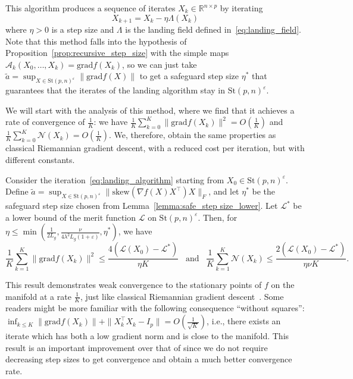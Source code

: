 \documentclass[twoside,11pt]{article}
\newcommand{\grad}{{\mathrm{grad}}}
\newcommand{\stiefel}{{\mathrm{St}(p, n)}}
\newcommand{\sk}{{\mathrm{skew}}}
\newcommand{\finalrevision}[1]{{#1}}
\begin{document}
This algorithm produces a sequence of iterates $X_k \in \mathbb{R}^{n\times p}$ by iterating
\begin{equation}
  \label{eq:landing_algorithm}
      X_{k+1} = X_k  - \eta \Lambda(X_k)
\end{equation}
where $\eta>0$ is a step size and $\Lambda$ is the landing field defined in~\eqref{eq:landing_field}. Note that this method falls into the hypothesis of Proposition~\ref{prop:recursive_step_size} with the simple maps $\mathcal{A}_k(X_0, \dots, X_k) = \grad f(X_k)$, so we can just take $\tilde{a} = \sup_{X\in\stiefel^\varepsilon}\|\grad f(X)\|$ to get a safeguard step size $\eta^*$ that guarantees that the iterates of the landing algorithm stay in $\stiefel^\varepsilon$.

We will start with the analysis of this method, where we find that it achieves a rate of convergence of $\frac1K$: we have $\frac1K\sum_{k=0}^K\|\grad f(X_k)\|^2 = O(\frac 1K)$ and $\frac1K\sum_{k=0}^K\mathcal{N}(X_k) = O(\frac 1K)$.
%
We, therefore, obtain the same properties as classical Riemannian gradient descent, with a reduced cost per iteration, but with different constants.

%
%
%

%
%
\begin{proposition}
\label{prop:convergence_landing}
  Consider the iteration~\eqref{eq:landing_algorithm} starting from $X_0\in\stiefel^\varepsilon$. Define $\tilde{a} = \sup_{X\in \stiefel^\varepsilon}\|\sk(\nabla f(X)X^\top)X\|_F$, and let $\eta^*$ be the safeguard step size chosen from Lemma~\ref{lemma:safe_step size_lower}.  Let $\mathcal{L}^*$ be a lower bound of the merit function $\mathcal{L}$ on $\stiefel^\varepsilon$. Then, for $\eta \leq \min(\frac1{2L_g}, \frac{\nu}{4\lambda^2L_g(1+\varepsilon)}, \eta^*)$, we have 
  \begin{equation*}
  \frac1K\sum_{k=1}^K\|\grad f (X_k)\|^2\leq \frac{4(\mathcal{L}(X_0) -\mathcal{L}^*)}{\eta K} \enspace \text{ and } \enspace \frac1K\sum_{k=1}^K\mathcal{N}(X_k)\leq \frac{2(\mathcal{L}(X_0) -\mathcal{L}^*)}{\eta\nu K}.
  \end{equation*}
\end{proposition}
%
%
%
%
%
%
%
%
%
%
%
  
%
%
%
  
%
%
%
%
%
%
%
%
%
%
%


This result demonstrates weak convergence to the stationary points of $f$ on the manifold at a rate $\frac1{K}$, 
%
just like classical Riemannian gradient descent~\citep{boumal2019global}.
\finalrevision{Some readers might be more familiar with the following consequence ``without squares'': $\inf_{k\leq K}\|\grad f(X_k)\| +\|X_k^{\top}X_k-I_p\| =O(\frac{1}{\sqrt{K}})$, i.e., there exists an iterate which has both a low gradient norm and is close to the manifold.}
This result is an important improvement over that of \cite{ablin2022fast} since we do not require decreasing step sizes to get convergence and obtain a much better convergence rate. 
\end{document}
